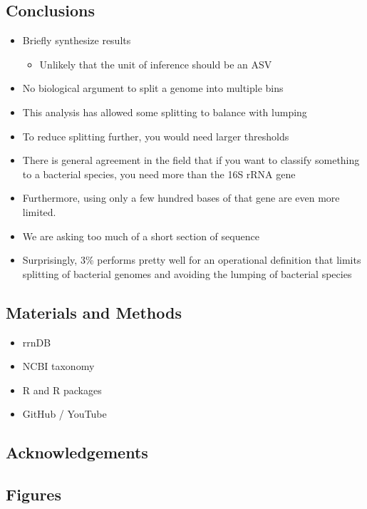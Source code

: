 \documentclass[
]{article}
\providecommand{\tightlist}{%
  \setlength{\itemsep}{0pt}\setlength{\parskip}{0pt}}
\begin{document}
\newpage

\hypertarget{conclusions}{%
\subsection{Conclusions}\label{conclusions}}

\begin{itemize}
\item
  Briefly synthesize results

  \begin{itemize}
  \tightlist
  \item
    Unlikely that the unit of inference should be an ASV
  \end{itemize}
\item
  No biological argument to split a genome into multiple bins
\item
  This analysis has allowed some splitting to balance with lumping
\item
  To reduce splitting further, you would need larger thresholds
\item
  There is general agreement in the field that if you want to classify
  something to a bacterial species, you need more than the 16S rRNA gene
\item
  Furthermore, using only a few hundred bases of that gene are even more
  limited.
\item
  We are asking too much of a short section of sequence
\item
  Surprisingly, 3\% performs pretty well for an operational definition
  that limits splitting of bacterial genomes and avoiding the lumping of
  bacterial species
\end{itemize}

\newpage

\hypertarget{materials-and-methods}{%
\subsection{Materials and Methods}\label{materials-and-methods}}

\begin{itemize}
\tightlist
\item
  rrnDB
\item
  NCBI taxonomy
\item
  R and R packages
\item
  GitHub / YouTube
\end{itemize}

\newpage

\hypertarget{acknowledgements}{%
\subsection{Acknowledgements}\label{acknowledgements}}

\newpage

\hypertarget{figures}{%
\subsection{Figures}\label{figures}}
\end{document}
